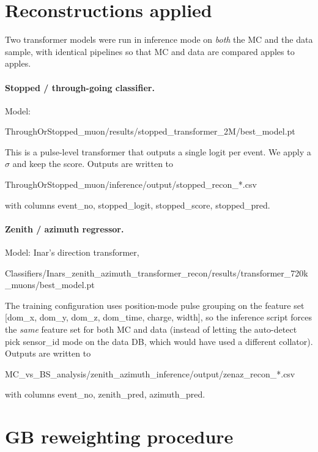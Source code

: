 \documentclass[11pt]{article}
\begin{document}
\section{Reconstructions applied}

Two transformer models were run in inference mode on \emph{both} the MC and
the data sample, with identical pipelines so that MC and data are compared
apples to apples.

\paragraph{Stopped / through\nobreakdash-going classifier.}
Model:
\begin{center}
ThroughOrStopped\_muon/results/stopped\_transformer\_2M/best\_model.pt
\end{center}
This is a pulse\nobreakdash-level transformer that outputs a single logit per
event. We apply a $\sigma$ and keep the score. Outputs are written to
\begin{center}
ThroughOrStopped\_muon/inference/output/stopped\_recon\_*.csv
\end{center}
with columns event\_no, stopped\_logit, stopped\_score, stopped\_pred.

\paragraph{Zenith / azimuth regressor.}
Model: Inar's direction transformer,
\begin{center}
Classifiers/Inars\_zenith\_azimuth\_transformer\_recon/results/transformer\_720k\_muons/best\_model.pt
\end{center}
The training configuration uses position\nobreakdash-mode pulse grouping on the
feature set [dom\_x, dom\_y, dom\_z, dom\_time, charge, width], so the inference
script forces the \emph{same} feature set for both MC and data (instead of
letting the auto\nobreakdash-detect pick sensor\_id mode on the data DB,
which would have used a different collator). Outputs are written to
\begin{center}
MC\_vs\_BS\_analysis/zenith\_azimuth\_inference/output/zenaz\_recon\_*.csv
\end{center}
with columns event\_no, zenith\_pred, azimuth\_pred.

\section{GB reweighting procedure}
\end{document}
